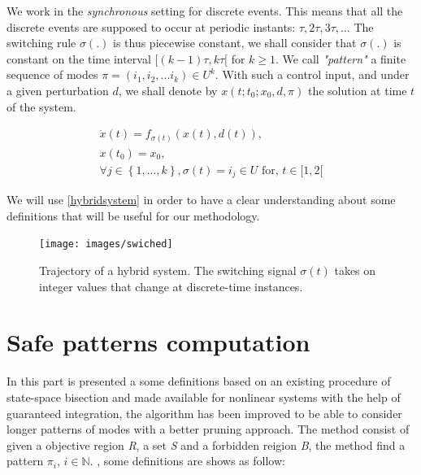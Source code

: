     We work in the \emph{synchronous} setting for discrete events. This means
    that all the discrete events are supposed to occur at periodic instants:
    $\tau, 2\tau, 3\tau, ...$ The switching rule $\sigma(.)$ is thus piecewise
    constant, we shall consider that $\sigma(.)$ is constant on the time interval
    $[(k-1)\tau,k\tau[$ for $k \geqslant 1 $. We call \emph{"pattern"} a finite
    sequence of modes $\pi =  (i_1,i_2,...i_k) \in U^k$. With such a control
    input, and under a given perturbation $d$, we shall denote by $x(t;t_0;x_0,d,\pi)$
    the solution at time $t$ of the system.
    
    \begin{equation} %
        \begin{array}{l}
            \dot x (t) = f_{\sigma(t)}(x(t),d(t)), \\
            x(t_0) = x_0, \\
            \forall j \in \left\lbrace 1, ... , k \right\rbrace, \sigma(t)=i_j
            \in U \text{ for, } t \in \lbrack 1,2 \lbrack
        \end{array}
        \label{hybridsystem}
    \end{equation}


    We will use \ref{hybridsystem} in order to have a clear understanding about
    some definitions that will be useful for our methodology.

    \begin{figure}[!h]
        \begin{center}
            \texttt{[image: images/swiched]}
            \caption{Trajectory of a hybrid system. The switching signal
            ${\sigma(t)}$ takes on integer values that change at 
            discrete-time instances.\citep{liberzon2003switching}}
        \end{center}
    \end{figure}



\section{Safe patterns computation}
\label{sec:safepatterncomputation}
    In this part is presented a some definitions based on an existing 
    procedure of state-space bisection and made available for nonlinear 
    systems  with the help of guaranteed integration, the algorithm has
    been  improved to be able to consider longer patterns of modes with a better
    pruning approach. The method consist of given a objective region 
    \emph{R}, a set \emph{S} and a forbidden reigion \emph{B}, the method find a pattern $\pi_i$, $i \in 
    \mathbb{N}$. \cite{le2016distributed}, some definitions are shows as follow:

